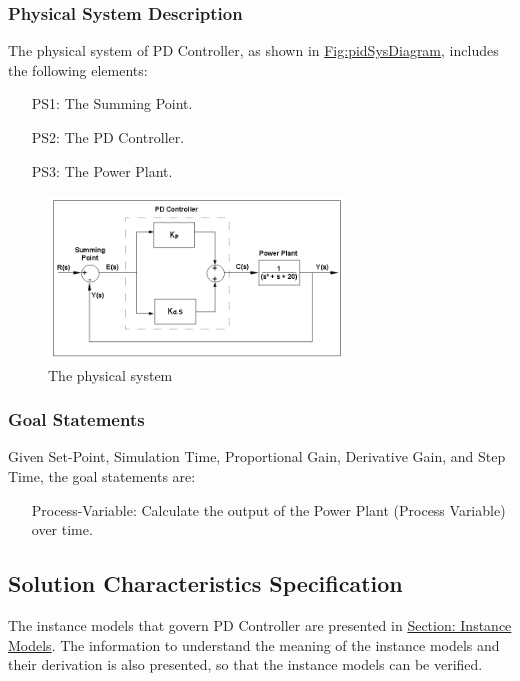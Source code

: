 \documentclass[12pt]{article}
\begin{document}
\subsubsection{Physical System Description}
\label{Sec:PhysSyst}
The physical system of PD Controller, as shown in \hyperref[Figure:pidSysDiagram]{Fig:pidSysDiagram}, includes the following elements:

\begin{itemize}
\item[PS1:]{The Summing Point.}
\item[PS2:]{The PD Controller.}
\item[PS3:]{The Power Plant.}
\end{itemize}
\begin{figure}
\begin{center}
\includegraphics[width=0.7\textwidth]{../../../datafiles/PDController/Fig_PDController.png}
\caption{The physical system}
\label{Figure:pidSysDiagram}
\end{center}
\end{figure}
\subsubsection{Goal Statements}
\label{Sec:GoalStmt}
Given Set-Point, Simulation Time, Proportional Gain, Derivative Gain, and Step Time, the goal statements are:

\begin{itemize}
\item[Process-Variable:\phantomsection\label{processVariable}]{Calculate the output of the Power Plant (Process Variable) over time.}
\end{itemize}
\subsection{Solution Characteristics Specification}
\label{Sec:SolCharSpec}
The instance models that govern PD Controller are presented in \hyperref[Sec:IMs]{Section: Instance Models}. The information to understand the meaning of the instance models and their derivation is also presented, so that the instance models can be verified.
\end{document}
